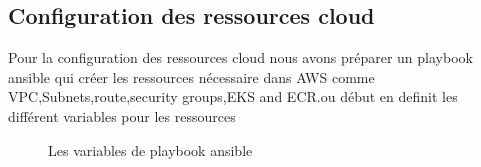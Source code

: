\subsection{\selectfont\Large  Configuration des ressources cloud}
\textsf{\selectfont{} Pour la configuration des ressources cloud nous avons préparer un playbook ansible qui créer les ressources nécessaire dans AWS comme VPC,Subnets,route,security groups,EKS and ECR.ou début en definit les différent variables pour les ressources}
\begin{figure}[H]
    \begin{center}
    \end{center}
    \caption{Les variables de playbook ansible}
    \end{figure}
